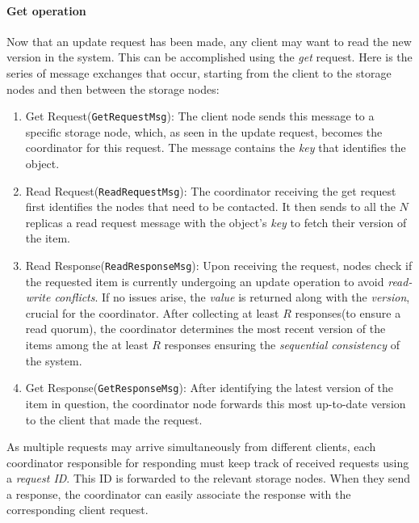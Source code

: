 \documentclass[a4paper, 11pt]{article}
\begin{document}
\paragraph{Get operation} Now that an update request has been made, any client may want to read the new version in the system. This can be accomplished using the \textit{get} request. Here is the series of message exchanges that occur, starting from the client to the storage nodes and then between the storage nodes:

\begin{enumerate}
    \item Get Request(\verb|GetRequestMsg|): The client node sends this message to a specific storage node, which, as seen in the update request, becomes the coordinator for this request. The message contains the \textit{key} that identifies the object.

    \item Read Request(\verb|ReadRequestMsg|): The coordinator receiving the get request first identifies the nodes that need to be contacted. It then sends to all the $N$ replicas a read request message with the object's \textit{key} to fetch their version of the item.

    \item Read Response(\verb|ReadResponseMsg|): Upon receiving the request, nodes check if the requested item is currently undergoing an update operation to avoid \textit{read-write conflicts}. If no issues arise, the \textit{value} is returned along with the \textit{version}, crucial for the coordinator. After collecting at least $R$ responses(to ensure a read quorum), the coordinator determines the most recent version of the items among the at least $R$ responses ensuring the \textit{sequential consistency} of the system.

    \item Get Response(\verb|GetResponseMsg|): After identifying the latest version of the item in question, the coordinator node forwards this most up-to-date version to the client that made the request.
\end{enumerate}

\begin{Summary}
As multiple requests may arrive simultaneously from different clients, each coordinator responsible for responding must keep track of received requests using a \textit{request ID}. This ID is forwarded to the relevant storage nodes. When they send a response, the coordinator can easily associate the response with the corresponding client request.
\end{Summary}
\end{document}
